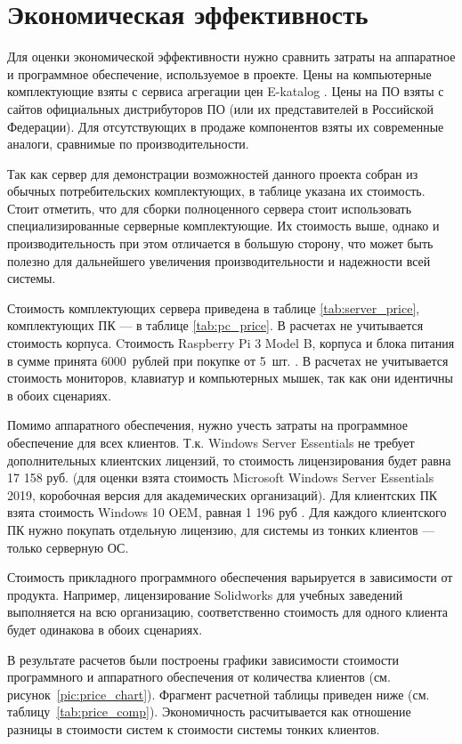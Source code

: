 \section{Экономическая эффективность}

Для оценки экономической эффективности нужно сравнить затраты на аппаратное и
программное обеспечение, используемое в проекте. Цены на компьютерные комплектующие
взяты с сервиса агрегации цен E-katalog \cite{ref:eeekatalog}. Цены на ПО взяты с сайтов
официальных дистрибуторов ПО (или их представителей в Российской Федерации).  Для
отсутствующих в продаже компонентов взяты их современные аналоги, сравнимые по
производительности.

Так как сервер для демонстрации возможностей данного проекта собран из обычных
потребительских комплектующих, в таблице указана их стоимость. Стоит отметить, что для
сборки полноценного сервера стоит использовать специализированные серверные 
комплектующие. Их стоимость выше, однако и производительность при этом отличается в
большую сторону, что может быть полезно для дальнейшего увеличения производительности и
надежности всей системы.

Стоимость комплектующих сервера приведена в таблице \ref{tab:server_price},
комплектующих ПК — в таблице \ref{tab:pc_price}. В расчетах не учитывается стоимость
корпуса. Cтоимость Raspberry Pi 3 Model B, корпуса и блока питания в сумме принята
6000~рублей при покупке от 5~шт. \cite{ref:raspberry_price}. В расчетах не учитывается
стоимость мониторов, клавиатур и компьютерных мышек, так как они идентичны в обоих
сценариях.

Помимо аппаратного обеспечения, нужно учесть затраты на программное обеспечение для всех
клиентов. Т.к. Windows Server Essentials не требует дополнительных клиентских лицензий,
то стоимость лицензирования будет равна 17 158 руб. (для оценки взята стоимость
Microsoft Windows Server Essentials 2019, коробочная версия для академических
организаций). Для клиентских ПК взята стоимость Windows 10 OEM, равная 1 196 руб
\cite{ref:windows_price}. Для каждого клиентского ПК нужно покупать отдельную лицензию,
для системы из тонких клиентов — только серверную ОС.

Стоимость прикладного программного обеспечения варьируется в зависимости от продукта.
Например, лицензирование Solidworks для учебных заведений выполняется на всю
организацию, соответственно стоимость для одного клиента будет одинакова в обоих
сценариях.

В результате расчетов были построены графики зависимости стоимости программного и
аппаратного обеспечения от количества клиентов (см. рисунок~\ref{pic:price_chart}).
Фрагмент расчетной таблицы приведен ниже (см. таблицу~\ref{tab:price_comp}).
Экономичность расчитывается как отношение разницы в стоимости систем к стоимости системы
тонких клиентов.

